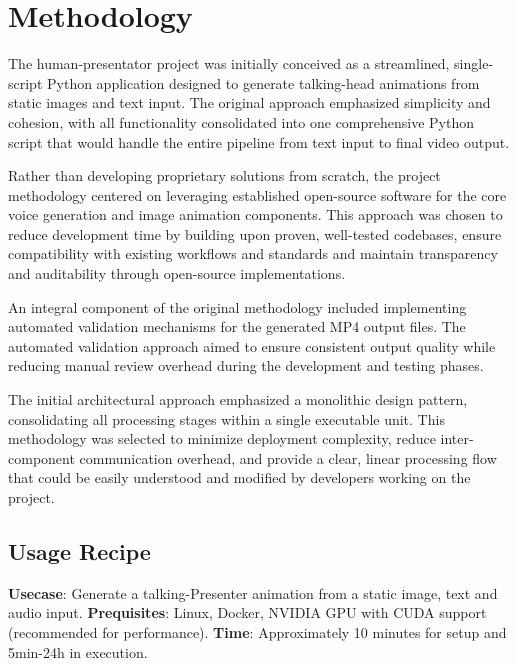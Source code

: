 
\section{Methodology}

The human-presentator project was initially conceived as a streamlined, single-script Python
application designed to generate talking-head animations from static images and text input. The
original approach emphasized simplicity and cohesion, with all functionality consolidated into one
comprehensive Python script that would handle the entire pipeline from text input to final video
output.

Rather than developing proprietary solutions from scratch, the project methodology centered on
leveraging established open-source software for the core voice generation and image animation
components. This approach was chosen to reduce development time by building upon proven, well-tested
codebases, ensure compatibility with existing workflows and standards and maintain transparency and
auditability through open-source implementations.

An integral component of the original methodology included implementing automated validation
mechanisms for the generated MP4 output files. The automated validation approach aimed to ensure
consistent output quality while reducing manual review overhead during the development and testing
phases.

The initial architectural approach emphasized a monolithic design pattern, consolidating all
processing stages within a single executable unit. This methodology was selected to minimize
deployment complexity, reduce inter-component communication overhead, and provide a clear, linear
processing flow that could be easily understood and modified by developers working on the project.

\subsection{Usage Recipe}


\textbf{Usecase}: Generate a talking-Presenter animation from a static image, text and audio input.
\textbf{Prequisites}: Linux, Docker, NVIDIA GPU with CUDA support (recommended for performance).
\textbf{Time}: Approximately 10 minutes for setup and 5min-24h in execution.


